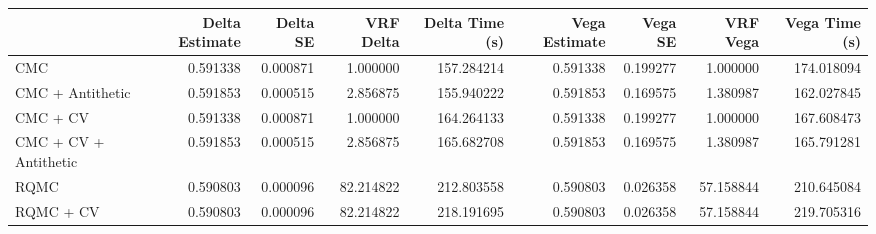 \begin{tabular}{lrrrrrrrr}
\toprule
 & Delta Estimate & Delta SE & VRF Delta & Delta Time (s) & Vega Estimate & Vega SE & VRF Vega & Vega Time (s) \\
\midrule
CMC & 0.591338 & 0.000871 & 1.000000 & 157.284214 & 0.591338 & 0.199277 & 1.000000 & 174.018094 \\
CMC + Antithetic & 0.591853 & 0.000515 & 2.856875 & 155.940222 & 0.591853 & 0.169575 & 1.380987 & 162.027845 \\
CMC + CV & 0.591338 & 0.000871 & 1.000000 & 164.264133 & 0.591338 & 0.199277 & 1.000000 & 167.608473 \\
CMC + CV + Antithetic & 0.591853 & 0.000515 & 2.856875 & 165.682708 & 0.591853 & 0.169575 & 1.380987 & 165.791281 \\
RQMC & 0.590803 & 0.000096 & 82.214822 & 212.803558 & 0.590803 & 0.026358 & 57.158844 & 210.645084 \\
RQMC + CV & 0.590803 & 0.000096 & 82.214822 & 218.191695 & 0.590803 & 0.026358 & 57.158844 & 219.705316 \\
\bottomrule
\end{tabular}

